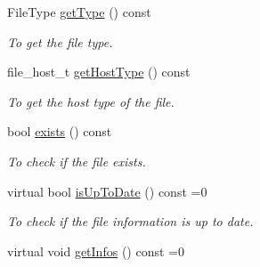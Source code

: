 \begin{DoxyCompactItemize}
FileType \hyperlink{classFile_ad83dca0e922f784eba36047e7f47fad7}{getType} () const 
\begin{DoxyCompactList}\small\item\em To get the file type. \item\end{DoxyCompactList}\item 
file\_\-host\_\-t \hyperlink{classFile_a52ba4dce39f96117d09a5b52c97c57a5}{getHostType} () const 
\begin{DoxyCompactList}\small\item\em To get the host type of the file. \item\end{DoxyCompactList}\item 
bool \hyperlink{classFile_a44ecfb6abf4c56065e773785787f2fb0}{exists} () const 
\begin{DoxyCompactList}\small\item\em To check if the file exists. \item\end{DoxyCompactList}\item 
virtual bool \hyperlink{classFile_aac96e148c3f4e1271ed40fee9a88be77}{isUpToDate} () const =0
\begin{DoxyCompactList}\small\item\em To check if the file information is up to date. \item\end{DoxyCompactList}\item 
\hypertarget{classFile_a55331b760dc854b4a056c2d76dc03c9f}{
virtual void \hyperlink{classFile_a55331b760dc854b4a056c2d76dc03c9f}{getInfos} () const =0}
\label{classFile_a55331b760dc854b4a056c2d76dc03c9f}


\end{DoxyCompactItemize}
